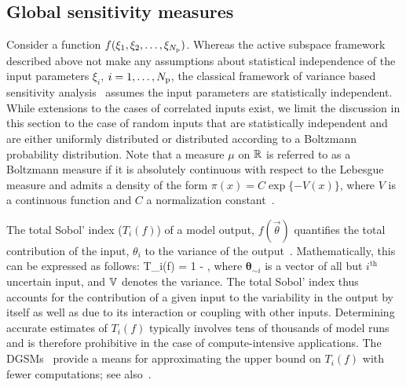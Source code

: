   

\subsection{Global sensitivity measures}

\label{sub:gsa}
Consider a function $f(\xi_1, \xi_2, \ldots, \xi_{N_\text{p}})$. 
Whereas the active subspace framework described above not make any assumptions
about statistical independence of the input parameters $\xi_i$, $i = 1, \ldots, {N_\text{p}}$, 
the classical 
framework of variance based sensitivity analysis~\cite{Sobol:2001, Saltelli:2010} assumes the input
parameters are statistically independent. While extensions to the cases 
of correlated inputs exist, we limit the discussion in this section to the
case of random inputs that are statistically independent and are 
either uniformly distributed or
distributed according to a Boltzmann probability distribution.
Note that a measure $\mu$
on $\mathbb{R}$ is referred to as a Boltzmann measure if it is 
absolutely continuous with respect to the Lebesgue measure  
and admits a density  of the form $\pi(x) = C \exp\{-V(x)\}$,
where $V$ is a continuous function and $C$ a normalization 
constant~\cite{Lamboni:2013}.


The total Sobol' index ($T_i(f)$) of a model output, $f(\vec\theta)$ quantifies
the total contribution of the input, $\theta_i$ to the variance of the
output~\cite{Sobol:2001}. Mathematically, this can be expressed as follows:
%
\be
T_i(f) = 1 - 
,
\label{eq:total}
\ee
%
where $\bm{\theta}_{\sim i}$ is a vector of all but $i^\text{th}$ uncertain
input, and $\mathbb{V}$ denotes the variance. The total Sobol' index thus accounts
for the contribution of a given input to the variability in the output by itself
as well as due to its interaction or coupling with other inputs. 
Determining accurate estimates of $T_i(f)$ typically involves tens of
thousands of model runs and is therefore prohibitive in the case of
compute-intensive applications. The DGSMs~\cite{Sobol:2009} provide a means for
approximating the upper bound on $T_i(f)$ with fewer computations; see 
also~\cite{Vohra:2018}. 


